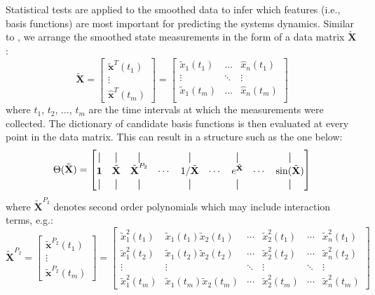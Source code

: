 \documentclass[12pt]{article}
\newcommand*{\vertbar}{\rule[-1ex]{0.5pt}{2.5ex}}
\begin{document}
Statistical tests are applied to the smoothed data to  infer which   features (i.e., basis functions) are most important for predicting the systems dynamics. Similar to \cite{brunton2016discovering}, we arrange the smoothed state measurements in the form of a data matrix $\tilde{\textbf{X}}$:
\begin{equation}
\label{eq:data_matrix}
\tilde{\textbf{X}}  =\begin{bmatrix}
\tilde{\textbf{x}}^{T}(t_1) \\ \vdots \\ \hat{\textbf{x}}^{T}(t_m)
\end{bmatrix}  = \begin{bmatrix}
\tilde{x}_1 (t_1) & \dots & \hat{x}_n (t_1)  \\
\vdots & \ddots & \vdots \\
\tilde{x}_1 (t_m) & \dots & \hat{x}_n (t_m) \\
\end{bmatrix}
\end{equation}
where $t_1$, $t_2$, $\dots$, $t_m$ are the time intervals at which the measurements were collected. The dictionary of candidate basis functions is then evaluated at every point in the data matrix. This can result in a structure such as the one below: 
\begin{equation}
\label{eq:basis_functions}
\Theta (\tilde{\textbf{X}} ) = \begin{bmatrix}
\vertbar  & \vertbar & \vertbar &  & \vertbar & &  \vertbar & & \vertbar \\
\textbf{1} & \tilde{\textbf{X}} & \tilde{\textbf{X}}^{P_2} & \cdots & 1/\tilde{\textbf{X}} & \cdots & e^{\tilde{\textbf{X}}} & \cdots & \sin (\tilde{\textbf{X}})   \\
\vertbar  & \vertbar & \vertbar &  & \vertbar & &  \vertbar & & \vertbar
\end{bmatrix}
\end{equation}
where $\tilde{\textbf{X}}^{P_2}$ denotes second order polynomials which may include interaction terms, e.g.:
\begin{equation}
\label{eq:second_order_poly}
\tilde{\textbf{X}}^{P_2}  = \begin{bmatrix}  \tilde{\textbf{x}}^{P_2}(t_1) \\ \vdots \\ \tilde{\textbf{x}}^{P_2}(t_m) \end{bmatrix}  = \begin{bmatrix}
\tilde{x}_1^2(t_1) & \tilde{x}_1(t_1) \tilde{x}_2(t_1)  & \cdots & \tilde{x}_2^2(t_1) & \cdots & \tilde{x}_n^2(t_1)\\
\tilde{x}_1^2(t_2) & \tilde{x}_1(t_2) \tilde{x}_2(t_2)  & \cdots & \tilde{x}_2^2(t_2) & \cdots & \tilde{x}_n^2(t_2) \\
\vdots & \vdots & \ddots & \vdots & \ddots & \vdots \\
\tilde{x}_1^2(t_m) & \tilde{x}_1(t_m) \tilde{x}_2(t_m)  & \cdots & \tilde{x}_2^2(t_m) & \cdots & \tilde{x}_n^2(t_m)
\end{bmatrix}
\end{equation}
\end{document}
